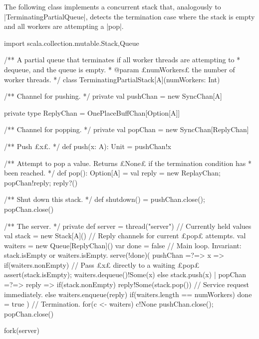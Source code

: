 
\begin{answerI}
The following class implements a concurrent stack that, analogously to
|TerminatingPartialQueue|, detects the termination case where the stack is
empty and all workers are attempting a |pop|.
%
\begin{scala}
import scala.collection.mutable.{Stack,Queue}

/** A partial queue that terminates if all worker threads are attempting to
  * dequeue, and the queue is empty.
  * @param £numWorkers£ the number of worker threads. */
class TerminatingPartialStack[A](numWorkers: Int){
  /** Channel for pushing. */
  private val pushChan = new SyncChan[A]

  private type ReplyChan = OnePlaceBuffChan[Option[A]]

  /** Channel for popping. */
  private val popChan = new SyncChan[ReplyChan]

  /** Push £x£. */
  def push(x: A): Unit = pushChan!x

  /** Attempt to pop a value.  Returns £None£ if the termination condition has
    * been reached. */
  def pop(): Option[A] = { 
    val reply = new ReplayChan; popChan!reply; reply?() 
  }

  /** Shut down this stack. */
  def shutdown() = { pushChan.close(); popChan.close() }

  /** The server. */
  private def server = thread("server"){
    // Currently held values
    val stack = new Stack[A]()
    // Reply channels for current £pop£ attempts.
    val waiters = new Queue[ReplyChan]() 
    var done = false
    // Main loop.  Invariant: stack.isEmpty or waiters.isEmpty.
    serve(!done)(
      pushChan =?=> { x => 
        if(waiters.nonEmpty){ // Pass £x£ directly to a waiting £pop£
          assert(stack.isEmpty); waiters.dequeue()!Some(x)
        }
        else stack.push(x)
      }
      |  
      popChan =?=> { reply =>
        if(stack.nonEmpty) 
          reply!Some(stack.pop()) // Service request immediately.
        else{
          waiters.enqueue(reply)
          if(waiters.length == numWorkers) done = true
        }
      }
    )
    // Termination.
    for(c <- waiters) c!None
    pushChan.close(); popChan.close()
  }

  fork(server)
}
\end{scala}



\end{answerI}
